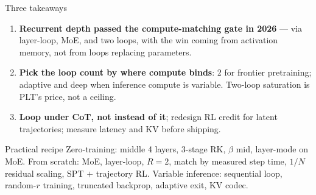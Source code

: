 \documentclass[aspectratio=169,10pt]{beamer}
\begin{document}
\begin{frame}{Three takeaways}
  \begin{enumerate}
    \item \textbf{Recurrent depth passed the compute-matching gate in 2026} --- via layer-loop, MoE, and two loops, with the win coming from activation memory, not from loops replacing parameters.
    \item \textbf{Pick the loop count by where compute binds}: 2 for frontier pretraining; adaptive and deep when inference compute is variable. Two-loop saturation is PLT's price, not a ceiling.
    \item \textbf{Loop under CoT, not instead of it}; redesign RL credit for latent trajectories; measure latency and KV before shipping.
  \end{enumerate}
  \vspace{8pt}
  \begin{block}{Practical recipe}
    Zero-training: middle 4 layers, 3-stage RK, $\beta$ mid, layer-mode on MoE. \quad
    From scratch: MoE, layer-loop, $R{=}2$, match by measured step time, $1/N$ residual scaling, SPT $+$ trajectory RL. \quad
    Variable inference: sequential loop, random-$r$ training, truncated backprop, adaptive exit, KV codec.
  \end{block}
\end{frame}
\end{document}
